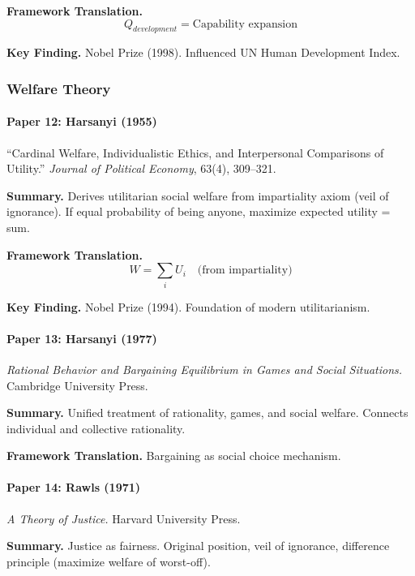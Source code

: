 \textbf{Framework Translation.}
\begin{equation}
Q_{development} = \text{Capability expansion}
\end{equation}

\textbf{Key Finding.}
Nobel Prize (1998). Influenced UN Human Development Index.

\subsubsection{Welfare Theory}

\paragraph{Paper 12: Harsanyi (1955)}

``Cardinal Welfare, Individualistic Ethics, and Interpersonal Comparisons 
of Utility.''
\textit{Journal of Political Economy}, 63(4), 309--321.

\textbf{Summary.}
Derives utilitarian social welfare from impartiality axiom (veil of ignorance).
If equal probability of being anyone, maximize expected utility = sum.

\textbf{Framework Translation.}
\begin{equation}
W = \sum_i U_i \quad \text{(from impartiality)}
\end{equation}

\textbf{Key Finding.}
Nobel Prize (1994). Foundation of modern utilitarianism.

\paragraph{Paper 13: Harsanyi (1977)}

\textit{Rational Behavior and Bargaining Equilibrium in Games and Social Situations.}
Cambridge University Press.

\textbf{Summary.}
Unified treatment of rationality, games, and social welfare. 
Connects individual and collective rationality.

\textbf{Framework Translation.}
Bargaining as social choice mechanism.

\paragraph{Paper 14: Rawls (1971)}

\textit{A Theory of Justice.}
Harvard University Press.

\textbf{Summary.}
Justice as fairness. Original position, veil of ignorance, difference 
principle (maximize welfare of worst-off).


